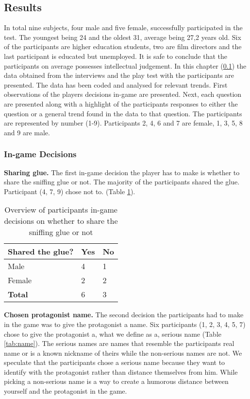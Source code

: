 \subsection{Results} \label{Results}
In total nine subjects, four male and five female, successfully participated in the test. The youngest being 24 and the oldest 31, average being 27,2 years old. Six of the participants are higher education students, two are film directors and the last participant is educated but unemployed. It is safe to conclude that the participants on average possesses intellectual judgement. In this chapter (\ref{Results}) the data obtained from the interviews and the play test with the participants are presented. The data has been coded and analysed for relevant trends. First observations of the players decisions in-game are presented. Next, each question are presented along with a highlight of the participants responses to either the question or a general trend found in the data to that question. The participants are represented by number (1-9). Participants 2, 4, 6 and 7 are female, 1, 3, 5, 8 and 9 are male. 

\subsubsection{In-game Decisions}

\textbf{Sharing glue.} The first in-game decision the player has to make is whether to share the sniffing glue or not. The majority of the participants shared the glue. Participant (4, 7, 9) chose not to. (Table \ref{tab:glue}).

\begin{table}[h]
\centering
\begin{tabular}{l l l}
\hline
\textbf{Shared the glue?} & Yes & No \\
\hline
Male & 4 & 1 \\
Female & 2 & 2 \\
\textbf{Total} & 6 & 3 \\
\hline
\end{tabular}
\caption{\label{tab:glue}Overview of participants in-game decisions on whether to share the sniffing glue or not}
\end{table}


\textbf{Chosen protagonist name.} The second decision the participants had to make in the game was to give the protagonist a name. Six participants (1, 2, 3, 4, 5, 7) chose to give the protagonist a, what we define as a, serious name (Table \ref{tab:name}). The serious names are names that resemble the participants real name or is a known nickname of theirs while the non-serious names are not. We speculate that the participants chose a serious name because they want to identify with the protagonist rather than distance themselves from him. While picking a non-serious name is a way to create a humorous distance between yourself and the protagonist in the game.


